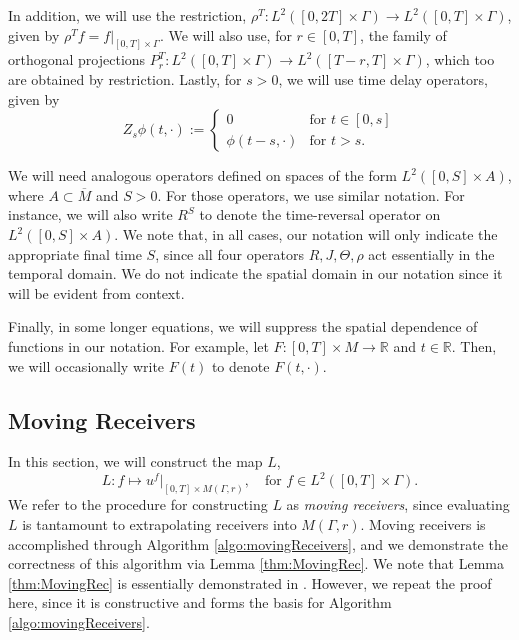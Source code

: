 \documentclass[final,leqno]{siamart1116}
\begin{document}
In addition, we will use the restriction, $\rho^T : L^2([0,2T] \times
\Gamma) \rightarrow L^2([0,T] \times \Gamma)$, given by $\rho^T f =
f|_{[0,T] \times \Gamma}$. We will also use, for $r \in [0,T]$, the
family of orthogonal projections $P_r^T : L^2([0,T] \times \Gamma)
\rightarrow L^2([T-r,T] \times \Gamma)$, which too are obtained by
restriction. Lastly, for $s > 0$, we will use time delay operators,
given by
\begin{equation}
  Z_s \phi(t, \cdot) := \left\{
  \begin{array}{cl} 
    0 & \text{for $t \in [0,s]$} \\
    \phi(t-s, \cdot) & \text{for $t > s$}.
  \end{array}
  \right.
\end{equation}

We will need analogous operators defined on spaces of the form
$L^2([0,S] \times A)$, where $A \subset \overline{M}$ and $S > 0$. For
those operators, we use similar notation. For instance, we will also
write $R^S$ to denote the time-reversal operator on $L^2([0,S] \times
A)$. We note that, in all cases, our notation will only indicate the
appropriate final time $S$, since all four operators $R,J,\Theta,\rho$
act essentially in the temporal domain. We do not indicate the spatial
domain in our notation since it will be evident from context.

Finally, in some longer equations, we will suppress the spatial
dependence of functions in our notation. For example, let $F :
[0,T]\times M \rightarrow {\mathbb{R}}$ and $t \in {\mathbb{R}}$. Then, we will
occasionally write $F(t)$ to denote $F(t,\cdot)$.

\subsection{Moving Receivers}
\label{subsec:MovingRec}

In this section, we will construct the map $L$,
\begin{equation}
  \label{eqn:definingLAgain}
  L : f \mapsto u^f|_{[0,T] \times M(\Gamma,r)}, \quad \text{for $f
    \in L^2([0,T] \times \Gamma)$.}
\end{equation}
We refer to the procedure for constructing $L$ as
\emph{moving receivers}, since evaluating $L$ is tantamount to
extrapolating receivers into $M(\Gamma,r)$.  Moving receivers is
accomplished through Algorithm \ref{algo:movingReceivers}, and we
demonstrate the correctness of this algorithm via Lemma
\ref{thm:MovingRec}. We note that Lemma \ref{thm:MovingRec} is
essentially demonstrated in \cite[Lemma 7]{Bingham2008}. However, we
repeat the proof here, since it is constructive and forms the basis
for Algorithm \ref{algo:movingReceivers}.
\end{document}
